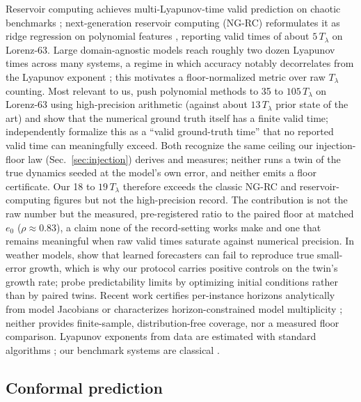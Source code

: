\documentclass[aps,pre,twocolumn,superscriptaddress,nofootinbib,longbibliography]{revtex4-2}
\newcommand{\Tlyap}{T_\lambda}
\begin{document}
Reservoir computing achieves multi-Lyapunov-time valid prediction on
chaotic benchmarks \citep{pathak2018modelfree,vlachas2020backpropagation};
next-generation reservoir computing (NG-RC) reformulates it as ridge
regression on polynomial features \citep{gauthier2021ngrc}, reporting
valid times of about $5\,\Tlyap$ on Lorenz-63. Large domain-agnostic
models reach roughly two dozen Lyapunov times across many systems, a
regime in which accuracy notably decorrelates from the Lyapunov exponent
\citep{gilpin2023modelscale}; this motivates a floor-normalized metric
over raw $\Tlyap$ counting. Most relevant to us,
\citet{schotz2025machineprecision} push polynomial methods to 35 to
$105\,\Tlyap$ on Lorenz-63 using high-precision arithmetic (against about
$13\,\Tlyap$ prior state of the art) and show that the numerical ground
truth itself has a finite valid time; \citet{hurley2025reservoir}
independently formalize this as a ``valid ground-truth time'' that no
reported valid time can meaningfully exceed. Both recognize the same
ceiling our injection-floor law (Sec.~\ref{sec:injection}) derives and
measures; neither runs a twin of the true dynamics seeded at the model's
own error, and neither emits a floor certificate. Our 18 to $19\,\Tlyap$
therefore exceeds the classic NG-RC and reservoir-computing figures but
not the high-precision record. The contribution is not the raw number but
the measured, pre-registered ratio to the paired floor at matched $e_0$
($\rho \approx 0.83$), a claim none of the record-setting works make and
one that remains meaningful when raw valid times saturate against
numerical precision. In weather models, \citet{selz2023butterfly} show
that learned forecasters can fail to reproduce true small-error growth,
which is why our protocol carries positive controls on the twin's growth
rate; \citet{vonich2025atmospheric} probe predictability limits by
optimizing initial conditions rather than by paired twins. Recent work
certifies per-instance horizons analytically from model Jacobians
\citep{wang2026certified} or characterizes horizon-constrained model
multiplicity \citep{kale2026rashomon}; neither provides finite-sample,
distribution-free coverage, nor a measured floor comparison. Lyapunov
exponents from data are estimated with standard algorithms
\citep{wolf1985determining,rosenstein1993practical,kantz1994robust}; our
benchmark systems are classical
\citep{lorenz1963deterministic,rossler1976equation,mackey1977oscillation}.

\subsection{Conformal prediction}
\end{document}
